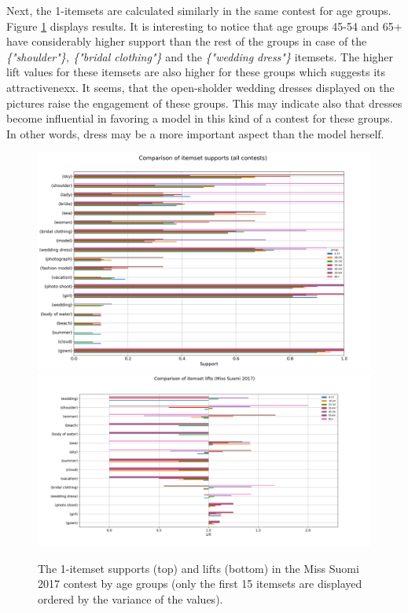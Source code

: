 
Next, the 1-itemsets are calculated similarly in the same contest for age groups. Figure \ref{itemset_supports-age_group-Miss_Helsinki-1_itemset} displays results. It is interesting to notice that age groups 45-54 and 65+ have considerably higher support than the rest of the groups in case of the \emph{\{"shoulder"\}, \{"bridal clothing"\}} and the \emph{\{"wedding dress"\}} itemsets. The higher lift values for these itemsets are also higher for these groups which suggests its attractivenexx. It seems, that the open-sholder wedding dresses displayed on the pictures raise the engagement of these groups. This may indicate also that dresses become influential in favoring a model in this kind of a contest for these groups. In other words, dress may be a more important aspect than the model herself.

\begin{figure}[] 
    \begin{center}
        \includegraphics[width=1.2\textwidth,center]{Images/itemset_supports-age_group-Miss_Helsinki-1_itemset.png}
        \includegraphics[width=1.2\textwidth,center]{Images/itemset_lifts-age_group-Miss_Suomi-1_itemsets.png}
        \caption{The 1-itemset supports (top) and lifts (bottom) in the Miss Suomi 2017 contest by age groups (only the first 15 itemsets are displayed ordered by the variance of the values).}
        \label{itemset_supports-age_group-Miss_Helsinki-1_itemset}
    \end{center}
\end{figure}

